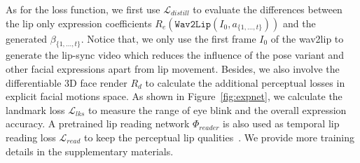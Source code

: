 As for the loss function,
we first use $\mathcal{L}_{distill}$ to evaluate the differences between the lip only expression coefficients ${R}_{e}(\mathtt{Wav2Lip}(I_0, a_{\{1,...,t\}}))$ and the generated $\beta_{\{1,...,t\}}$. Notice that, we only use the first frame $I_{0}$ of the wav2lip to generate the lip-sync video which reduces the influence of the pose variant and  other facial expressions apart from lip movement. 
Besides, we also involve the differentiable 3D face render $R_{d}$ to calculate the additional perceptual losses in explicit facial motions space.  
As shown in Figure~\ref{fig:expnet}, we calculate the landmark loss $\mathcal{L}_{lks}$ to measure the range of eye blink and the overall expression accuracy. A pretrained lip reading network $\Phi_{reader}$ is also used as temporal lip reading loss $\mathcal{L}_{read}$ to keep the perceptual lip qualities~\cite{wav2lip, spectre}. We provide more training details in the supplementary materials.



